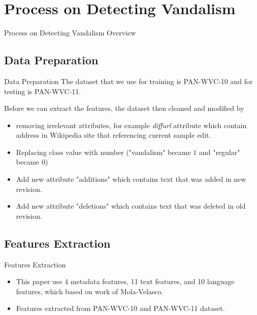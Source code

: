 \documentclass{beamer}
\begin{document}

\section{Process on Detecting Vandalism}

\begin{frame}
	\begin{multicols}{2}
		\tableofcontents[currentsection]
	\end{multicols}
\end{frame}

\begin{frame}
	{Process on Detecting Vandalism}
	{Overview}
	
\end{frame}

\subsection{Data Preparation}

\begin{frame}{Data Preparation}
	The dataset that we use for training is PAN-WVC-10 and for
	testing is PAN-WVC-11.

	Before we can extract the features, the dataset then cleaned and
	modified by
	\begin{itemize}
	\item removing irrelevant attributes, for example \textit{diffurl}
	attribute which contain address in Wikipedia site that referencing current
	sample edit.
	\item Replacing class value with number ("vandalism" became $1$
	and "regular" became $0$)
	\item Add new attribute "additions" which contains text that was added in
	new revision.
	\item Add new attribute "deletions" which contains text that was deleted in
	old revision.
	\end{itemize}
\end{frame}

\subsection{Features Extraction}

\begin{frame}{Features Extraction}
	\begin{itemize}
	\item This paper use 4 metadata features, 11 text features, and 10 language
	features, which based on work of Mola-Velasco.
	\item Features extracted from PAN-WVC-10 and PAN-WVC-11 dataset.
	\end{itemize}

\end{frame}
\end{document}
